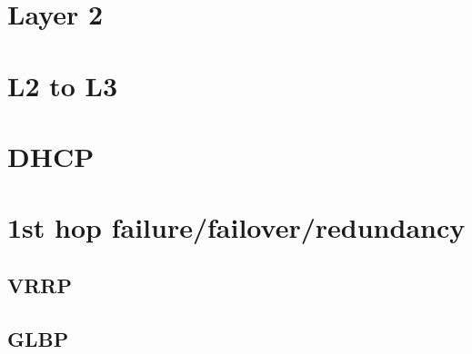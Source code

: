 \documentclass[a4paper,12pt,twoside,twocolumn,landscape]{book}
\begin{document}


\tableofcontents

\setlength{\parskip}{0.35em} %
\renewcommand{\baselinestretch}{1.15} %

	




\chapter{Layer 2}



\newpage




\chapter{L2 to L3}




\chapter{DHCP}




\chapter{1st hop failure/failover/redundancy}

\section{VRRP}

\section{GLBP}
\end{document}

